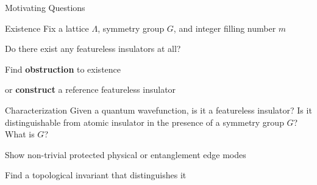 \begin{frame}{Motivating Questions}
\vskip-1.5cm


\begin{block}{Existence}
Fix a lattice $\Lambda$, symmetry group $G$, and integer filling number $m$

Do there exist any featureless insulators at all?
\bi 
\item Find \textbf{obstruction} to existence
\item or \textbf{construct} a reference featureless insulator
\ei 
\end{block}

\begin{block}{Characterization}
Given a quantum wavefunction, is it a featureless insulator? Is it distinguishable from atomic insulator in the presence of a symmetry group $G$? What is $G$?

\bi
\item Show non-trivial protected physical or entanglement edge modes 
\item Find a topological invariant that distinguishes it
\ei 
\end{block}
\end{frame}